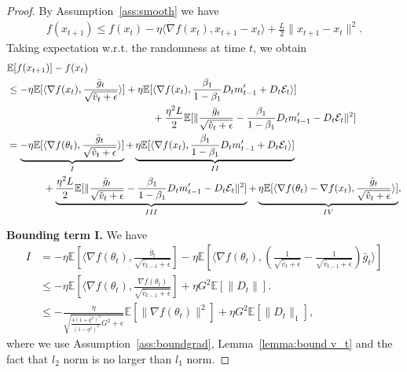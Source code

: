 \documentclass[11pt]{article}
\begin{document}
\begin{proof}
By Assumption~\ref{ass:smooth} we have
\begin{align*}
    f(x_{t+1})\leq f(x_t)-\eta\langle \nabla f(x_t), x_{t+1}-x_t\rangle+\frac{L}{2}\| x_{t+1}-x_t\|^2.
\end{align*}
Taking expectation w.r.t. the randomness at time $t$, we obtain 
\begin{align}
    &\mathbb E[f(x_{t+1})]-f(x_t) \nonumber\\
    &\leq -\eta\mathbb E[\langle \nabla f(x_t), \frac{\bar g_t}{\sqrt{\hat v_t+\epsilon}}\rangle]+\eta \mathbb E[\langle \nabla f(x_t), \frac{\beta_1}{1-\beta_1}D_tm_{t-1}'+D_t\mathcal E_t\rangle] \nonumber\\
    &\hspace{2in} +\frac{\eta^2L}{2}\mathbb E[\|\frac{\bar g_t}{\sqrt{\hat v_t+\epsilon}}-\frac{\beta_1}{1-\beta_1}D_tm_{t-1}'- D_t\mathcal E_t\|^2] \nonumber\\
    &=\underbrace{-\eta\mathbb E[\langle \nabla f(\theta_t), \frac{\bar g_t}{\sqrt{\hat v_t+\epsilon}}\rangle]}_{I}+\underbrace{\eta \mathbb E[\langle \nabla f(x_t), \frac{\beta_1}{1-\beta_1}D_tm_{t-1}'+D_t\mathcal E_t\rangle]}_{II} \nonumber\\
    &\hspace{0.5in} +\underbrace{\frac{\eta^2L}{2}\mathbb E[\|\frac{\bar g_t}{\sqrt{\hat v_t+\epsilon}}-\frac{\beta_1}{1-\beta_1}D_tm_{t-1}'- D_t\mathcal E_t\|^2]}_{III}+\underbrace{\eta\mathbb E[\langle \nabla f(\theta_t)-\nabla f(x_t), \frac{\bar g_t}{\sqrt{\hat v_t+\epsilon}} \rangle]}_{IV}, \label{eq0}
\end{align}

\textbf{Bounding term I.} We have
\begin{align}
    I&=-\eta\mathbb E[\langle \nabla f(\theta_t), \frac{\bar g_t}{\sqrt{\hat v_{t-1}+\epsilon}}]-\eta\mathbb E[\langle \nabla f(\theta_t), (\frac{1}{\sqrt{\hat v_t+\epsilon}}-\frac{1}{\sqrt{\hat v_{t-1}+\epsilon}})\bar g_t\rangle] \nonumber\\
    &\leq -\eta\mathbb E[\langle \nabla f(\theta_t), \frac{\nabla f(\theta_t)}{\sqrt{\hat v_{t-1}+\epsilon}}]+\eta G^2\mathbb E[\|D_t\|].  \nonumber\\
    &\leq -\frac{\eta}{\sqrt{\frac{4(1+q^2)^3}{(1-q^2)^2}G^2+\epsilon}}\mathbb E[\|\nabla f(\theta_t)\|^2]+\eta G^2\mathbb E[\|D_t\|_1], \label{eq:I}
\end{align}
where we use Assumption~\ref{ass:boundgrad}, Lemma~\ref{lemma:bound v_t} and the fact that $l_2$ norm is no larger than $l_1$ norm.


\end{proof}
\end{document}
